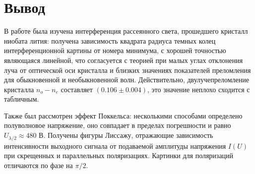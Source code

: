\documentclass[a4paper,12pt]{article} %
\begin{document}
\section{Вывод}

\hfill \break В работе была изучена интерференция рассеянного света, прошедшего кристалл ниобата лития: получена зависимость квадрата радиуса темных колец интерференционной картины от номера минимума, с хорошей точностью являющаяся линейной, что согласуется с теорией при малых углах отклонения луча от оптической оси кристалла и близких значениях показателей преломления для обыкновенной и необыкновенной волн. Действительно, двулучепреломление кристалла $n_o - n_e$ составляет $(0.106 \pm 0.004)$, это значение неплохо сходится с табличным.
	
\hfill \break Также был рассмотрен эффект Поккельса: несколькими способами определено полуволновое напряжение, оно совпадает в пределах погрешности и равно $U_{\lambda/2} \approx 480$ В. Получены фигуры Лиссажу, отражающие зависимость интенсивности выходного сигнала от подаваемой амплитуды напряжения $I(U)$ при скрещенных и параллельных поляризациях. Картинки для поляризаций отличаются по фазе на $\pi/2$.
\end{document}
